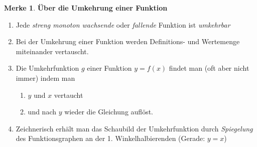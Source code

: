 \documentclass[a4paper, twoside, parskip, 10pt, smallheadings]{scrbook}
\theoremstyle{plain}
\theoremstyle{definition}
\newtheorem*{Mer}{Merke}
\newcommand{\bn}{\begin{enumerate}}
\newcommand{\en}{\end{enumerate}}
\newcommand{\bme}{\begin{Mer}}
\newcommand{\eme}{\end{Mer}}
\begin{document}
\bme 
{\bf Über die Umkehrung einer Funktion}
\bn \item
Jede {\it streng monoton wachsende} oder {\it fallende} Funktion ist {\it umkehrbar}
\item Bei der Umkehrung einer Funktion werden Definitions- und Wertemenge miteinander vertauscht.
\item Die Umkehrfunktion $g$ einer Funktion $y=f(x)$ findet man  (oft aber nicht immer) indem man  \bn \item  $y$ und $x$ vertaucht \item und nach $y$ wieder die Gleichung auflöst.\en 
\item Zeichnerisch erhält man das Schaubild der Umkehrfunktion durch {\it Spiegelung} des Funktionsgraphen an der 1. Winkelhalbierenden (Gerade: $y=x$)
 
\en 
\eme 
\end{document}
